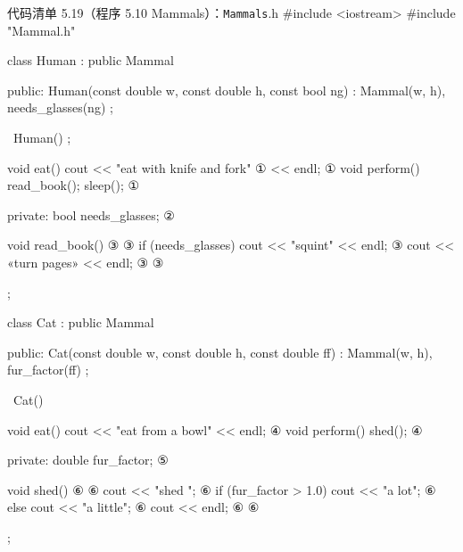 \begin{codeboxt}{代码清单 5.19（程序 5.10 Mammals）：\texttt{Mammals}.h}
#include <iostream>
#include "Mammal.h"

class Human : public Mammal
{
public:
    Human(const double w, const double h, const bool ng)
        : Mammal(w, h), needs_glasses(ng) {};

    ~Human() {};

    void eat()     { cout << "eat with knife and fork"      ①
                          << endl; }                        ①
    void perform() { read_book(); sleep(); }                ①

private:
    bool needs_glasses;                                     ②

    void read_book()                                        ③
    {                                                       ③
        if (needs_glasses) cout << "squint" << endl;        ③
        cout << «turn pages» << endl;                       ③
    }                                                       ③
};

class Cat : public Mammal
{
public:
    Cat(const double w, const double h, const double ff)
        : Mammal(w, h), fur_factor(ff) {};

    ~Cat() {}

    void eat()     { cout << "eat from a bowl" << endl; }   ④
    void perform() { shed(); }                              ④

private:
    double fur_factor;                                      ⑤

    void shed()                                             ⑥
    {                                                       ⑥
        cout << "shed ";                                    ⑥
        if (fur_factor > 1.0) cout << "a lot";              ⑥
        else                  cout << "a little";           ⑥
        cout << endl;                                       ⑥
    }                                                       ⑥
};
\end{codeboxt}
\par
{}\par
{}\par
{}\par
{}\par
{}\par

